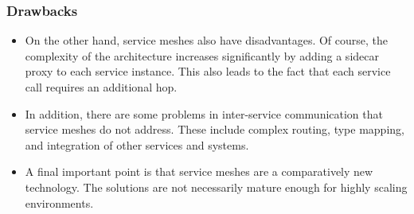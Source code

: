 \subsubsection{Drawbacks}

\begin{itemize}
    \item On the other hand, service meshes also have disadvantages. Of course, the complexity of the architecture increases significantly by adding a sidecar proxy to each service instance. This also leads to the fact that each service call requires an additional hop.
    \item In addition, there are some problems in inter-service communication that service meshes do not address. These include complex routing, type mapping, and integration of other services and systems.
    \item A final important point is that service meshes are a comparatively new technology. The solutions are not necessarily mature enough for highly scaling environments.
\end{itemize}







